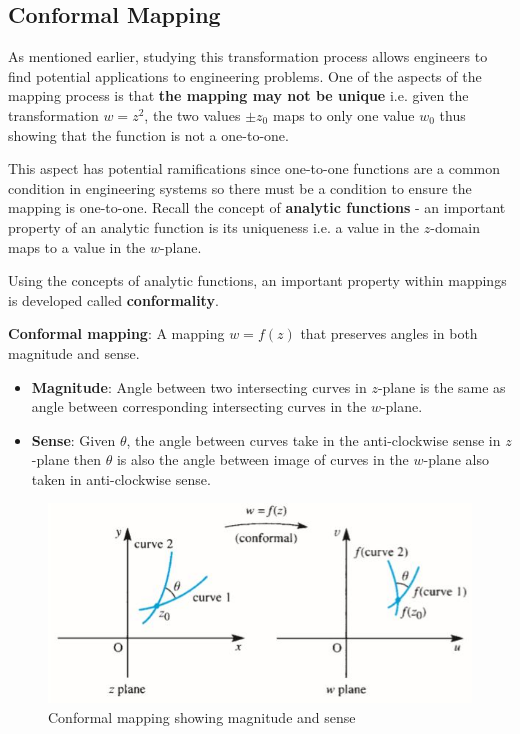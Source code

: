 \documentclass[10pt,a4paper]{article}
\begin{document}
\subsection{Conformal Mapping}

As mentioned earlier, studying this transformation process allows engineers to find potential
applications to engineering problems. One of the aspects of the mapping process is that \textbf{the
mapping may not be unique} i.e. given the transformation $w=z^2$, the two values $\pm z_0$ maps to
only one value $w_0$ thus showing that the function is not a one-to-one.

This aspect has potential ramifications since one-to-one functions are a common condition in
engineering systems so there must be a condition to ensure the mapping is one-to-one. Recall the
concept of \textbf{analytic functions} - an important property of an analytic function is its
uniqueness i.e. a value in the $z$-domain maps to a value in the $w$-plane.

Using the concepts of analytic functions, an important property within mappings is developed called \textbf{conformality}.

\begin{tcolorbox}[breakable,colback=white]
\textbf{Conformal mapping}: A mapping $w=f(z)$ that preserves angles in both magnitude and sense.
\begin{itemize}
    \item \textbf{Magnitude}: Angle between two intersecting curves in $z$-plane is the same as
    angle between corresponding intersecting curves in the $w$-plane.
    \item \textbf{Sense}: Given $\theta$, the angle between curves take in the anti-clockwise sense
    in $z$-plane then $\theta$ is also the angle between image of curves in the $w$-plane also taken in
    anti-clockwise sense.
\end{itemize}
\end{tcolorbox}
\begin{figure} [h!]
    \centering
    \includegraphics[scale=0.9]{sense and angle.JPG}
    \caption{Conformal mapping showing magnitude and sense}
\end{figure}
\end{document}
